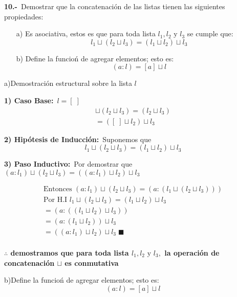\textbf{10.-}\ Demostrar que la concatenación de las listas tienen las siguientes propiedades:


    \begin{itemize}
        \setlength{\itemindent}{5em} 
        \item[a)] Es asociativa, estos es que para toda lista $l_1,l_2 \text{ y }l_3$ se cumple que: $$l_1 \sqcup (l_2 \sqcup l_3) = (l_1 \sqcup l_2) \sqcup l_3$$
                    
        
        \item[b)] Define la funcioń de agregar elementos; esto es:$$(a:l)=[a]\sqcup l$$
    \end{itemize}
    a)Demostración estructural sobre la lista  $l$
    
    \vspace{1em}

    \textbf{1) Caso Base:}\ $l = [\;]$
    \begin{gather}
        [\;]\sqcup(l_2\sqcup l_3)=(l_2\sqcup l_3)\\
        =([\;]\sqcup l_2)\sqcup l_3
    \end{gather}
    
    \textbf{2) Hipótesis de Inducción:}\ Suponemos que  $$l_1 \sqcup (l_2 \sqcup l_3) = (l_1 \sqcup l_2) \sqcup l_3$$

    \textbf{3) Paso Inductivo:}\ Por demostrar que $(a:l_1) \sqcup (l_2 \sqcup l_3) = ((a:l_1) \sqcup l_2) \sqcup l_3$

    \vspace{1em}
    \begin{gather}
    \text{Entonces } (a:l_1) \sqcup (l_2 \sqcup l_3)=(a:(l_1 \sqcup (l_2 \sqcup l_3)))\\
    \text{Por H.I } l_1 \sqcup (l_2 \sqcup l_3) = (l_1 \sqcup l_2) \sqcup l_3\\
    =(a:((l_1 \sqcup l_2) \sqcup l_3))\\
    =(a:(l_1 \sqcup l_2)) \sqcup l_3\\
    =((a:l_1) \sqcup l_2) \sqcup l_3 \; \blacksquare\\
    \end{gather}

    \textbf{$\therefore$ demostramos que para toda lista $l_1,l_2 \text{ y }l_3,$ la operación de concatenación $\sqcup$ es conmutativa}

    \vspace{1em}
    b)Define la funcioń de agregar elementos; esto es:$$(a:l)=[a]\sqcup l$$
    
